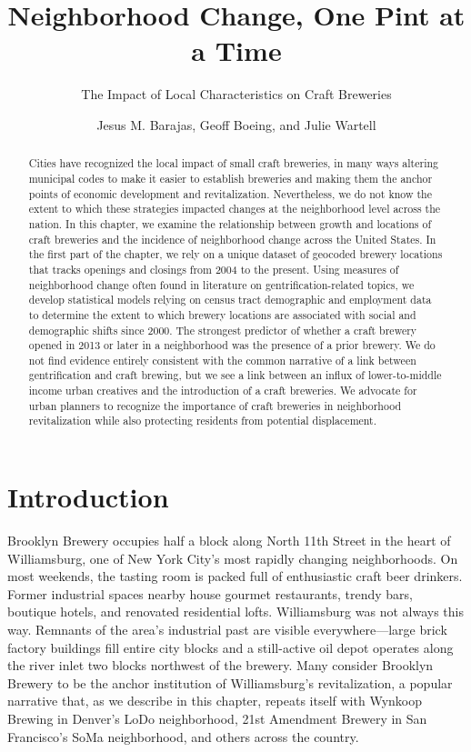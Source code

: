 \documentclass[]{article}
\title{Neighborhood Change, One Pint at a Time}
\subtitle{The Impact of Local Characteristics on Craft Breweries}
\author{Jesus M. Barajas, Geoff Boeing, and Julie Wartell}
\date{}
\begin{document}
\maketitle

\begin{abstract}
Cities have recognized the local impact of small craft breweries, in many ways altering municipal codes to make it easier to establish breweries and making them the anchor points of economic development and revitalization. Nevertheless, we do not know the extent to which these strategies impacted changes at the neighborhood level across the nation. In this chapter, we examine the relationship between growth and locations of craft breweries and the incidence of neighborhood change across the United States. In the first part of the chapter, we rely on a unique dataset of geocoded brewery locations that tracks openings and closings from 2004 to the present. Using measures of neighborhood change often found in literature on gentrification-related topics, we develop statistical models relying on census tract demographic and employment data to determine the extent to which brewery locations are associated with social and demographic shifts since 2000. The strongest predictor of whether a craft brewery opened in 2013 or later in a neighborhood was the presence of a prior brewery. We do not find evidence entirely consistent with the common narrative of a link between gentrification and craft brewing, but we see a link between an influx of lower-to-middle income urban creatives and the introduction of a craft breweries. We advocate for urban planners to recognize the importance of craft breweries in neighborhood revitalization while also protecting residents from potential displacement.
\end{abstract}

\section{Introduction}\label{introduction}

Brooklyn Brewery occupies half a block along North 11th Street in the
heart of Williamsburg, one of New York City's most rapidly changing
neighborhoods. On most weekends, the tasting room is packed full of
enthusiastic craft beer drinkers. Former industrial spaces nearby house
gourmet restaurants, trendy bars, boutique hotels, and renovated
residential lofts. Williamsburg was not always this way. Remnants of the
area's industrial past are visible everywhere---large brick factory
buildings fill entire city blocks and a still-active oil depot operates
along the river inlet two blocks northwest of the brewery. Many consider
Brooklyn Brewery to be the anchor institution of Williamsburg's
revitalization, a popular narrative that, as we describe in this
chapter, repeats itself with Wynkoop Brewing in Denver's LoDo
neighborhood, 21st Amendment Brewery in San Francisco's SoMa
neighborhood, and others across the country.
\end{document}
